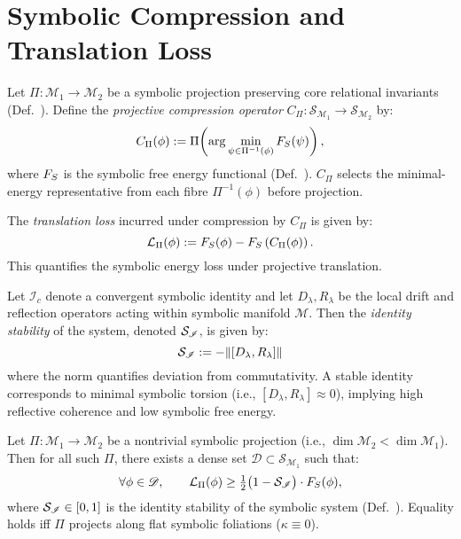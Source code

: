 \section[Symbolic Compression]{Symbolic Compression and Translation Loss}
\label{sec:bk8_symbolic_compression}
\begin{definition}
\label{definition:bk8_projective_compression_operator}
Let $\Pi : \mathcal{M}_1 \to \mathcal{M}_2$ be a symbolic projection preserving core relational invariants (Def.~).  
Define the \emph{projective compression operator} $C_\Pi : \mathscr{S}_{\mathcal{M}_1} \to \mathscr{S}_{\mathcal{M}_2}$ by:
\[
C_\Pi(\phi) := \Pi\!\left( \arg\min_{\psi \in \Pi^{-1}(\phi)} F_S(\psi) \right),
\]
where $F_S$ is the symbolic free energy functional (Def.~).  
$C_\Pi$ selects the minimal-energy representative from each fibre $\Pi^{-1}(\phi)$ before projection.
\end{definition}
\begin{definition}
\label{definition:bk8_translation_loss}
The \emph{translation loss} incurred under compression by $C_\Pi$ is given by:
\[
\mathcal{L}_\Pi(\phi) := F_S(\phi) - F_S\left(C_\Pi(\phi)\right).
\]
This quantifies the symbolic energy loss under projective translation.
\end{definition}
\begin{definition}
\label{definition:bk8_identitystability}
Let \( \mathscr{I}_c \) denote a convergent symbolic identity and let \( D_\lambda, R_\lambda \) be the local drift and reflection operators acting within symbolic manifold \( \mathcal{M} \). Then the \emph{identity stability} of the system, denoted \( \mathcal{S}_{\mathscr{I}} \), is given by:
\[
\mathcal{S}_{\mathscr{I}} := -\|[D_\lambda, R_\lambda]\|
\]
where the norm quantifies deviation from commutativity. A stable identity corresponds to minimal symbolic torsion (i.e., \([D_\lambda, R_\lambda] \approx 0\)), implying high reflective coherence and low symbolic free energy.
\end{definition}
\begin{theorem}
\label{theorem:bk8_no_free_projection}
Let $\Pi : \mathcal{M}_1 \to \mathcal{M}_2$ be a nontrivial symbolic projection (i.e., $\dim \mathcal{M}_2 < \dim \mathcal{M}_1$).  
Then for all such $\Pi$, there exists a dense set $\mathscr{D} \subset \mathscr{S}_{\mathcal{M}_1}$ such that:
\[
\forall \phi \in \mathscr{D}, \qquad 
\mathcal{L}_\Pi(\phi) \ge \tfrac{1}{2} \bigl(1 - \mathcal{S}_{\mathscr{I}}\bigr) \cdot F_S(\phi),
\]
where $\mathcal{S}_{\mathscr{I}} \in [0,1]$ is the identity stability of the symbolic system (Def.~).  
Equality holds iff $\Pi$ projects along flat symbolic foliations ($\kappa \equiv 0$).
\end{theorem}
